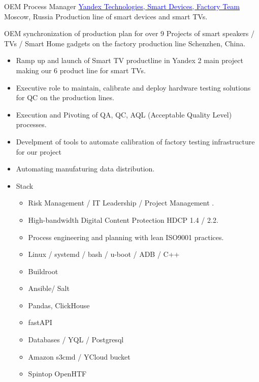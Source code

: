         { OEM Process Manager }
        {\href{https://www.yandex.com/alice}{\textcolor{blue}{Yandex Technologies, Smart Devices, Factory Team}}}
        {Moscow, Russia}
        {
        \newline
        Production line of smart devices and smart TVs.
        }
        {  OEM synchronization of production plan for over 9 Projects of smart speakers / TVs / Smart Home gadgets on the factory production line Schenzhen, China.
            \begin{itemize}
                \item Ramp up and launch of Smart TV productline in Yandex 2 main project making our 6 product line for smart TVs.
                \item Executive role to maintain, calibrate and deploy hardware testing solutions for QC on the production lines.
                \item Execution and Pivoting of QA, QC, AQL (Acceptable Quality Level) processes.
                \item Develpment of tools to automate calibration of factory testing infrastructure for our project
                \item Automating manufaturing data distribution.
                \item Stack
                    \begin{itemize}
                        \item[*] Risk Management / IT Leadership / Project Management .
                        \item[*] High-bandwidth Digital Content Protection HDCP 1.4 / 2.2.
                        \item[*] Process engineering and planning with lean ISO9001 practices.
                        \item[*] Linux / systemd / bash / u-boot / ADB / C++ 
                        \item[*] Buildroot
                        \item[*] Ansible/ Salt
                        \item[*] Pandas, ClickHouse
                        \item[*] fastAPI
                        \item[*] Databases / YQL / Postgresql
                        \item[*] Amazon s3cmd / YCloud bucket
                        \item[*] Spintop OpenHTF
                    \end{itemize}
                \end{itemize}
        }
        

